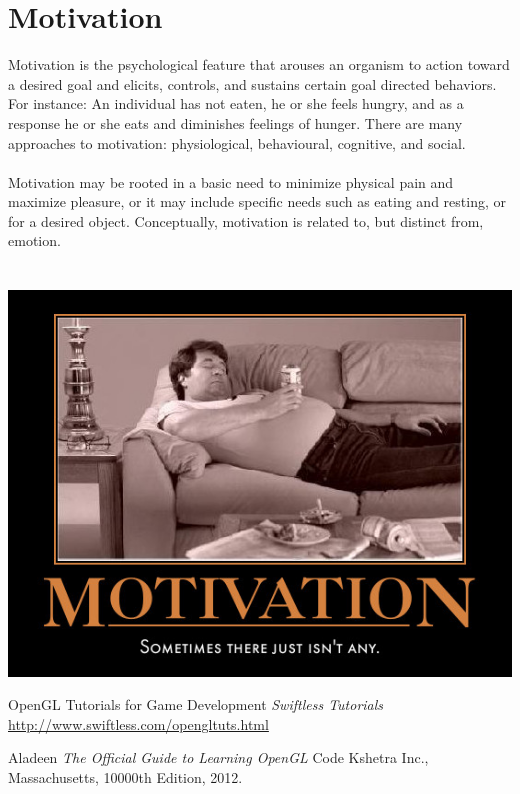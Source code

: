 \documentclass[12pt]{article} %
\begin{document}
\section{Motivation}
	Motivation is the psychological feature that arouses an organism to action toward a desired goal and elicits, controls, and sustains certain goal directed behaviors. For instance: An individual has not eaten, he or she feels hungry, and as a response he or she eats and diminishes feelings of hunger. There are many approaches to motivation: physiological, behavioural, cognitive, and social.\\
\\Motivation may be rooted in a basic need to minimize physical pain and maximize pleasure, or it may include specific needs such as eating and resting, or for a desired object. Conceptually, motivation is related to, but distinct from, emotion.
\\ \\ \\

\includegraphics[scale=0.8]{motivation.jpg}\\[1cm]   

\newpage

\begin{thebibliography}{9}

  OpenGL Tutorials for Game Development
  \emph{Swiftless Tutorials}
 \url{http://www.swiftless.com/opengltuts.html}

Aladeen
\emph{The Official Guide to
Learning OpenGL}
Code Kshetra Inc., Massachusetts,
  10000th Edition,
  2012.


\end{thebibliography}
\end{document}
